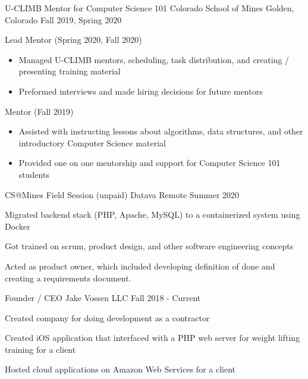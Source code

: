 \begin{cventries}
    \cventry
    	{U-CLIMB Mentor for Computer Science 101}
    	{ Colorado School of Mines }
    	{ Golden, Colorado}
	   	 {Fall 2019, Spring 2020  }
   	 {
   	 \begin{cvitems}
         \item {Lead Mentor (Spring 2020, Fall 2020)}
         \begin{itemize}
         \item {Managed U-CLIMB mentors, scheduling, task
    	distribution, and creating /
      presenting training material}
          \item {Preformed interviews and made hiring decisions for future mentors}
         \end{itemize}
         \item {Mentor (Fall 2019)}
         \begin{itemize}
            	 \item {Assisted with instructing lessons about algorithms, data structures, and other introductory Computer Science material}
   	         \item {Provided one on one mentorship and support for
    	Computer Science 101 students}
        \end{itemize}
      \end{cvitems}
      }

      \ifcv
    \cventry
    {CS@Mines Field Session (unpaid)}
    {Datava}
    {Remote}
    {Summer 2020}
    {
      \begin{cvitems}
        \item Migrated backend stack (PHP, Apache, MySQL) to a containerized system using Docker
        \item Got trained on scrum, product design, and other software engineering concepts
        \item Acted as product owner, which included developing definition of done and creating a requirements document.
      \end{cvitems}
    }

    \cventry
    {Founder / CEO}
    { Jake Vossen LLC }
    {}
    {Fall 2018 - Current}
    {
      \begin{cvitems}
        \item {Created company for doing development as a contractor}
        \item {Created iOS application that interfaced with a PHP web server for weight lifting training for a client}
        \item {Hosted cloud applications on Amazon Web Services for a client}
      \end{cvitems}
    }
    


\end{cventries}
